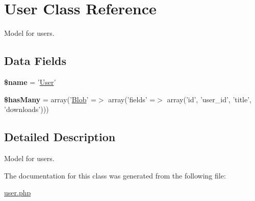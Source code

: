 \hypertarget{class_user}{
\section{User Class Reference}
\label{class_user}
}


Model for users.  


\subsection*{Data Fields}
\begin{DoxyCompactItemize}
\item 
\hypertarget{class_user_ab2fc40d43824ea3e1ce5d86dee0d763b}{
{\bfseries \$name} = '\hyperlink{class_user}{User}'}
\label{class_user_ab2fc40d43824ea3e1ce5d86dee0d763b}

\item 
\hypertarget{class_user_aa305c51f2c9efc1703200b92523e97fb}{
{\bfseries \$hasMany} = array('\hyperlink{class_blob}{Blob}' =$>$ array('fields' =$>$ array('id', 'user\_\-id', 'title', 'downloads')))}
\label{class_user_aa305c51f2c9efc1703200b92523e97fb}

\end{DoxyCompactItemize}


\subsection{Detailed Description}
Model for users. 

The documentation for this class was generated from the following file:\begin{DoxyCompactItemize}
\item 
\hyperlink{user_8php}{user.php}\end{DoxyCompactItemize}

